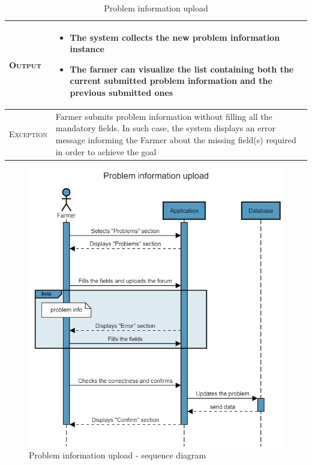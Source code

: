 \begin{table}[H]
\begin{tabular}{|l|m{}|}
    	\hline %
    	\textsc{Output}             &  \begin{itemize}
    	    \item The system collects the new problem information instance
    	    \item The farmer can visualize the list containing both the current submitted problem information and the previous submitted ones
    	\end{itemize}\\
    	\hline %
    	\textsc{Exception}         &   Farmer submits problem information without filling all the mandatory fields. In such case, the system displays an error message informing the Farmer about the missing field(s) required in order to achieve the goal\\
    	\hline %
        
    \end{tabular}

\caption{\label{tab:problem_information}Problem information upload}
\end{table}

\begin{figure}[H]
	\centering
    \includegraphics[page=1, width=\textwidth]{Images/Sequence diagrams/SW2- Problem information upload (fa).png}
	\caption{\label{fig:problem_info_seq_diag}Problem information upload - sequence diagram}
\end{figure}

